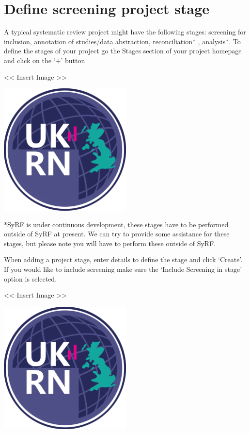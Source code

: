 \documentclass[
]{book}
\begin{document}
\hypertarget{define-screening-project-stage}{%
\section{Define screening project stage}\label{define-screening-project-stage}}

A typical systematic review project might have the following stages: screening for inclusion, annotation of studies/data abstraction, reconciliation* , analysis*.
To define the stages of your project go the Stages section of your project homepage and click on the `+' button

\textless{}\textless{} Insert Image \textgreater{}\textgreater{}

\includegraphics[width=0.5\textwidth,height=0.5\textheight]{figs/evidence-triangle.png}

*SyRF is under continuous development, these stages have to be performed outside of SyRF at present. We can try to provide some assistance for these stages, but please note you will have to perform these outside of SyRF.

When adding a project stage, enter details to define the stage and click `Create'. If you would like to include screening make sure the `Include Screening in stage' option is selected.

\textless{}\textless{} Insert Image \textgreater{}\textgreater{}

\includegraphics[width=0.5\textwidth,height=0.5\textheight]{figs/evidence-triangle.png}
\end{document}
